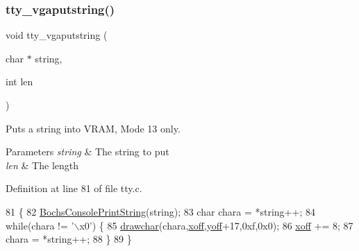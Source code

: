 \subsubsection{\texorpdfstring{tty\+\_\+vgaputstring()}{tty\_vgaputstring()}}
{\footnotesize\ttfamily void tty\+\_\+vgaputstring (\begin{DoxyParamCaption}\item[{char $\ast$}]{string,  }\item[{int}]{len }\end{DoxyParamCaption})}



Puts a string into V\+R\+AM, Mode 13 only. 


\begin{DoxyParams}{Parameters}
{\em string} & The string to put \\
\hline
{\em len} & The length \\
\hline
\end{DoxyParams}


Definition at line 81 of file tty.\+c.


\begin{DoxyCode}
81                                              \{
82     \hyperlink{a00056_a19e1f554d03c977f8b947f21489daa41_a19e1f554d03c977f8b947f21489daa41}{BochsConsolePrintString}(\textcolor{keywordtype}{string});
83     \textcolor{keywordtype}{char} chara = *\textcolor{keywordtype}{string}++;
84     \textcolor{keywordflow}{while}(chara != \textcolor{stringliteral}{'\(\backslash\)x0'}) \{
85         \hyperlink{a00041_a2c8df7a20b47341b70d97a7ff21d86ea_a2c8df7a20b47341b70d97a7ff21d86ea}{drawchar}(chara,\hyperlink{a00140_abaa0d20f0e52ce0d3a7d706f6ac16266_abaa0d20f0e52ce0d3a7d706f6ac16266}{xoff},\hyperlink{a00140_a1a7539764d0ae8cd06ce45c62cf92bca_a1a7539764d0ae8cd06ce45c62cf92bca}{yoff}+17,0xf,0x0);
86         \hyperlink{a00140_abaa0d20f0e52ce0d3a7d706f6ac16266_abaa0d20f0e52ce0d3a7d706f6ac16266}{xoff} += 8;
87         chara = *\textcolor{keywordtype}{string}++;
88     \}
89 \}
\end{DoxyCode}
